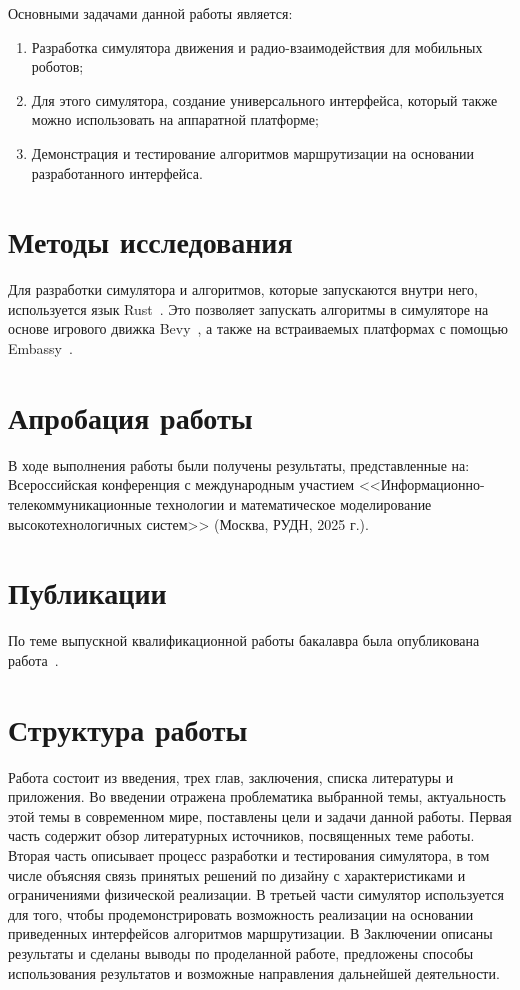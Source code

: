 \documentclass[%
]{report}
\begin{document}
Основными задачами данной работы является:

\begin{enumerate}
  \item Разработка симулятора движения и радио-взаимодействия для мобильных роботов;
  \item Для этого симулятора, создание универсального интерфейса,
  который также можно использовать на аппаратной платформе;
  \item Демонстрация и тестирование алгоритмов маршрутизации на основании разработанного интерфейса.
\end{enumerate}

\section{Методы исследования}

Для разработки симулятора и алгоритмов, которые запускаются внутри него,
используется язык Rust~\cite{klabnik2022rust,10.1145/2692956.2663188}.
Это позволяет запускать алгоритмы в симуляторе на основе игрового движка Bevy~\cite{bevyengine},
а также на встраиваемых платформах с помощью Embassy~\cite{embassy}.

\section{Апробация работы}

В ходе выполнения работы были получены результаты, представленные на:
Всероссийская конференция с международным участием
<<Информационно-телекоммуникационные технологии и математическое моделирование высокотехнологичных систем>> (Москва, РУДН, 2025 г.).


\section{Публикации}

По теме выпускной квалификационной работы бакалавра была опубликована работа~\cite{ittmm}.

\section{Структура работы}

Работа состоит из введения, трех глав, заключения, списка литературы и
приложения.
Во введении отражена проблематика выбранной темы, актуальность этой темы в современном мире, поставлены цели и задачи данной работы.
Первая часть содержит обзор литературных источников, посвященных теме работы.
Вторая часть описывает процесс разработки и тестирования симулятора,
в том числе объясняя связь принятых решений по дизайну с характеристиками и ограничениями физической реализации.
В третьей части симулятор используется для того, чтобы продемонстрировать возможность
реализации на основании приведенных интерфейсов алгоритмов маршрутизации.
В Заключении описаны результаты и сделаны выводы по проделанной работе,
предложены способы использования результатов и возможные направления дальнейшей деятельности.
\end{document}
